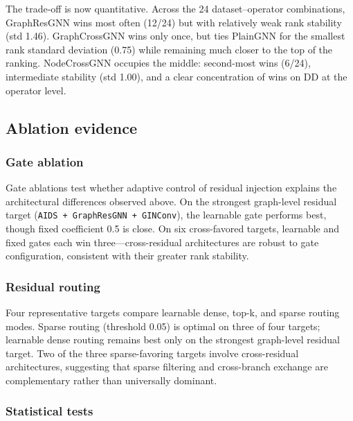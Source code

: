 The trade-off is now quantitative. Across the 24 dataset--operator combinations, GraphResGNN wins most often (12/24) but with relatively weak rank stability (std 1.46). GraphCrossGNN wins only once, but ties PlainGNN for the smallest rank standard deviation (0.75) while remaining much closer to the top of the ranking. NodeCrossGNN occupies the middle: second-most wins (6/24), intermediate stability (std 1.00), and a clear concentration of wins on DD at the operator level.

\subsection{Ablation evidence}

\subsubsection{Gate ablation}





Gate ablations test whether adaptive control of residual injection explains the architectural differences observed above. On the strongest graph-level residual target (\texttt{AIDS + GraphResGNN + GINConv}), the learnable gate performs best, though fixed coefficient 0.5 is close. On six cross-favored targets, learnable and fixed gates each win three---cross-residual architectures are robust to gate configuration, consistent with their greater rank stability.

\subsubsection{Residual routing}



Four representative targets compare learnable dense, top-k, and sparse routing modes. Sparse routing (threshold 0.05) is optimal on three of four targets; learnable dense routing remains best only on the strongest graph-level residual target. Two of the three sparse-favoring targets involve cross-residual architectures, suggesting that sparse filtering and cross-branch exchange are complementary rather than universally dominant.

\subsubsection{Statistical tests}


